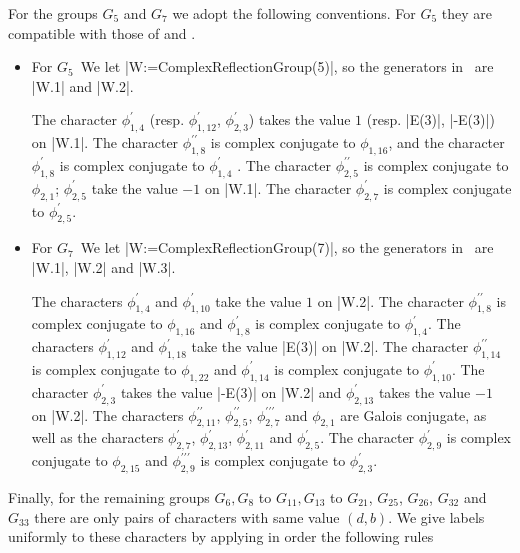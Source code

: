 For the groups $G_5$ and $G_7$ we adopt the following conventions.
For $G_5$ they are compatible with those of \cite{MR03} and \cite{BMM14}.
\begin{itemize}
\item  For $G_5$\:\
We  let |W:=ComplexReflectionGroup(5)|,  so the  generators in \CHEVIE\ are
|W.1| and |W.2|.

The     character    $\phi_{1,4}^\prime$    (resp.    $\phi_{1,12}^\prime$,
$\phi_{2,3}^\prime$)  takes the value $1$ (resp. |E(3)|, |-E(3)|) on |W.1|.
The   character   $\phi_{1,8}^{\prime\prime}$   is   complex  conjugate  to
$\phi_{1,16}$,  and the character  $\phi_{1,8}^\prime$ is complex conjugate
to  $\phi_{1,4}^\prime$  .  The  character  $\phi_{2,5}^{\prime\prime}$  is
complex  conjugate to $\phi_{2,1}$; $\phi_{2,5}^\prime$ take the value $-1$
on  |W.1|.  The  character  $\phi_{2,7}^\prime$  is  complex  conjugate  to
$\phi_{2,5}^\prime$.

\item  For $G_7$\:\
We  let |W:=ComplexReflectionGroup(7)|,  so the  generators in \CHEVIE\ are
|W.1|, |W.2| and |W.3|.

The  characters $\phi_{1,4}^\prime$ and $\phi_{1,10}^\prime$ take the value
$1$   on  |W.2|.  The   character  $\phi_{1,8}^{\prime\prime}$  is  complex
conjugate  to $\phi_{1,16}$ and $\phi_{1,8}^\prime$ is complex conjugate to
$\phi_{1,4}^\prime$.     The     characters     $\phi_{1,12}^\prime$    and
$\phi_{1,18}^\prime$   take  the  value  |E(3)|  on  |W.2|.  The  character
$\phi_{1,14}^{\prime\prime}$  is  complex  conjugate  to  $\phi_{1,22}$ and
$\phi_{1,14}^\prime$  is  complex  conjugate  to  $\phi_{1,10}^\prime$. The
character   $\phi_{2,3}^\prime$  takes  the  value  |-E(3)|  on  |W.2|  and
$\phi_{2,13}^\prime$   takes  the  value  $-1$  on  |W.2|.  The  characters
$\phi_{2,11}^{\prime\prime}$, $\phi_{2,5}^{\prime\prime}$,
$\phi_{2,7}^{\prime\prime\prime}$ and $\phi_{2,1}$ are Galois conjugate, as
well   as   the   characters   $\phi_{2,7}^\prime$,   $\phi_{2,13}^\prime$,
$\phi_{2,11}^\prime$ and $\phi_{2,5}^\prime$. The character
$\phi_{2,9}^\prime$    is   complex   conjugate    to   $\phi_{2,15}$   and
$\phi_{2,9}^{\prime\prime\prime}$ is complex conjugate to
$\phi_{2,3}^\prime$.
\end{itemize}

Finally,  for  the  remaining  groups  $G_6,  G_8$  to  $G_{11}, G_{13}$ to
$G_{21}$, $G_{25}$, $G_{26}$, $G_{32}$ and $G_{33}$ there are only pairs of
characters  with  same  value  $(d,b)$.  We  give labels uniformly to these
characters by applying in order the following rules \:\

